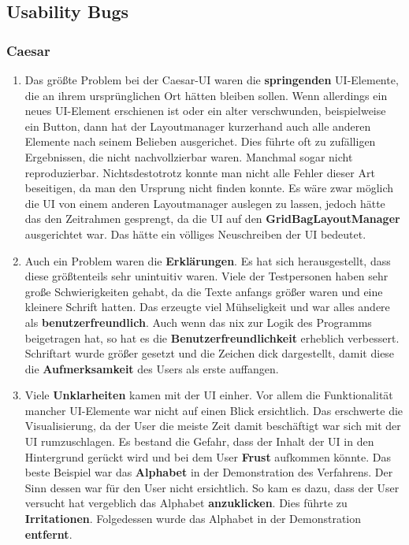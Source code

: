 \documentclass{article}
\begin{document}
  \subsection{Usability Bugs}
    \subsubsection{Caesar}
     \begin{enumerate}
      \item Das größte Problem bei der Caesar-UI waren die \textbf{springenden} UI-Elemente, die an ihrem ursprünglichen Ort hätten bleiben sollen.
            Wenn allerdings ein neues UI-Element erschienen ist oder ein alter verschwunden, beispielweise ein Button, dann hat der Layoutmanager kurzerhand auch alle anderen
            Elemente nach seinem Belieben ausgerichet. Dies führte oft zu zufälligen Ergebnissen, die nicht nachvollzierbar waren. Manchmal sogar nicht reproduzierbar.
            Nichtsdestotrotz konnte man nicht alle Fehler dieser Art beseitigen, da man den Ursprung nicht finden konnte.\newline 
            Es wäre zwar möglich die UI von einem anderen Layoutmanager auslegen zu lassen, jedoch hätte das den Zeitrahmen gesprengt, da die UI
            auf den \textbf{GridBagLayoutManager} ausgerichtet war. Das hätte ein völliges Neuschreiben der UI bedeutet. 
            
      \item Auch ein Problem waren die \textbf{Erklärungen}. Es hat sich herausgestellt, dass diese größtenteils sehr {unintuitiv} waren.
            Viele der Testpersonen haben sehr große Schwierigkeiten gehabt, da die Texte anfangs größer waren und eine kleinere Schrift hatten.
            Das erzeugte viel Mühseligkeit und war alles andere als \textbf{benutzerfreundlich}.\newline
            Auch wenn das nix zur Logik des Programms beigetragen hat, so hat es die \textbf{Benutzerfreundlichkeit} erheblich verbessert. 
            Schriftart wurde größer gesetzt und die Zeichen dick dargestellt, damit diese die \textbf{Aufmerksamkeit} des Users als erste auffangen.
            
      \item Viele \textbf{Unklarheiten} kamen mit der UI einher. Vor allem die Funktionalität mancher UI-Elemente war nicht auf einen Blick ersichtlich.
            Das erschwerte die Visualisierung, da der User die meiste Zeit damit beschäftigt war sich mit der UI rumzuschlagen. Es bestand die Gefahr, dass
            der Inhalt der UI in den Hintergrund gerückt wird und bei dem User \textbf{Frust} aufkommen könnte.\newline
            Das beste Beispiel war das \textbf{Alphabet} in der Demonstration des Verfahrens. Der Sinn dessen war für den User nicht ersichtlich.
            So kam es dazu, dass der User versucht hat vergeblich das Alphabet \textbf{anzuklicken}. Dies führte zu \textbf{Irritationen}. Folgedessen wurde das Alphabet 
            in der Demonstration \textbf{entfernt}.\newline
            

\end{enumerate}
\end{document}

